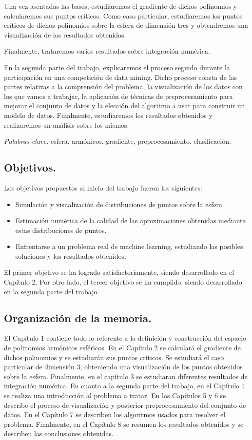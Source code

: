 Una vez asentadas las bases, estudiaremos el gradiente de dichos polinomios y calcularemos sus puntos críticos. Como caso particular, estudiaremos los puntos críticos de dichos polinomios sobre la esfera de dimensión tres y obtendremos una visualización de los resultados obtenidos.

Finalmente, trataremos varios resultados sobre integración numérica.
\bigskip

En la segunda parte del trabajo, explicaremos el proceso seguido durante la participación en una competición de data mining. Dicho proceso consta de las partes relativas a la comprensión del problema, la visualización de los datos con los que vamos a trabajar, la aplicación de técnicas de preprocesamiento para mejorar el conjunto de datos y la elección del algoritmo a usar para construir un modelo de datos. Finalmente, estudiaremos los resultados obtenidos y realizaremos un análisis sobre los mismos. 
	
\bigskip
\emph{Palabras clave:} esfera, armónicos, gradiente, preprocesamiento, clasificación.
\newpage


\subsection*{Objetivos.}
Los objetivos propuestos al inicio del trabajo fueron los siguientes:
\begin{itemize}
	\item Simulación y visualización de distribuciones de puntos sobre la esfera
	\item Estimación numérica de la calidad de las aproximaciones obtenidas mediante estas distribuciones de puntos. 
	\item Enfrentarse a un problema real de machine learning, estudiando las posibles soluciones y los resultados obtenidos.
\end{itemize}

El primer objetivo se ha logrado satisfactoriamente, siendo desarrollado en el Capítulo 2. Por otro lado, el tercer objetivo se ha cumplido, siendo desarrollado en la segunda parte del trabajo.

\subsection*{Organización de la memoria.}
\medskip

El Capítulo 1 contiene todo lo referente a la definición y construcción del espacio de polinomios armónicos esféricos.
En el Capítulo 2 se calculará el gradiente de dichos polinomios y se estudiarán sus puntos críticos. Se estudiará el caso particular de dimensión 3, obteniendo una visualización de los puntos obtenidos sobre la esfera.
Finalmente, en el capítulo 3 se estudiaran diferentes resultados de integración numérica.
En cuanto a la segunda parte del trabajo, en el Capítulo 4 se realiza una introducción al problema a tratar. 
En los Capítulos 5 y 6 se describe el proceso de visualización y posterior preprocesamiento del conjunto de datos.
En el Capítulo 7 se describen los algoritmos usados para resolver el problema.
Finalmente, en el Capítulo 8 se resumen los resultados obtenidos y se describen las conclusiones obtenidas.

